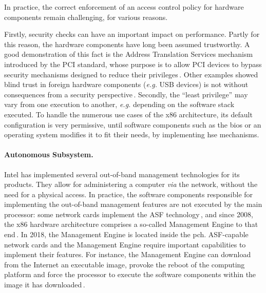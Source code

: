In practice, the correct enforcement of an access control policy for hardware
components remain challenging, for various reasons.

Firstly, security checks can have an important impact on performance.
%
Partly for this reason, the hardware components have long been assumed
trustworthy.
%
A good demonstration of this fact is the Address Translation Services mechanism
introduced by the PCI standard, whose purpose is to allow PCI devices to bypass
security mechanisms designed to reduce their
privileges\,\cite{daubignard2017protip}.
%
Other examples showed blind trust in foreign hardware components (\emph{e.g.}
USB devices) is not without consequences from a security
perspective\,\cite{nohl2014badusb,hudson2015thunderstrike,chifflier2013uefi}.
%
Secondly, the ``least privilege'' may vary from one execution to another,
\emph{e.g.} depending on the software stack executed.
%
To handle the numerous use cases of the x86 architecture, its default
configuration is very permissive, until software components such as the
\ac{bios} or an operating system modifies it to fit their needs, by implementing
\ac{hse} mechanisms.

%
\paragraph{Autonomous Subsystem.}
%
Intel has implemented several out-of-band management technologies for its
products.
%
They allow for administering a computer \emph{via} the network, without the need
for a physical access.
%
In practice, the software components responsible for implementing the
out-of-band management features are not executed by the main processor: some
network cards implement the ASF technology\,\cite{duflot2010network}, and since
2008, the x86 hardware architecture comprises a so-called Management
Engine to that end\,\cite{ruan2014me,skochinsky2014intel}.
%
In 2018, the Management Engine is located inside the \ac{pch}.
%
ASF-capable network cards and the Management Engine require important
capabilities to implement their features.
%
For instance, the Management Engine can download from the Internet an executable
image, provoke the reboot of the computing platform and force the processor
to execute the software components within the image it has
downloaded\,\cite{kumar2009active}.

